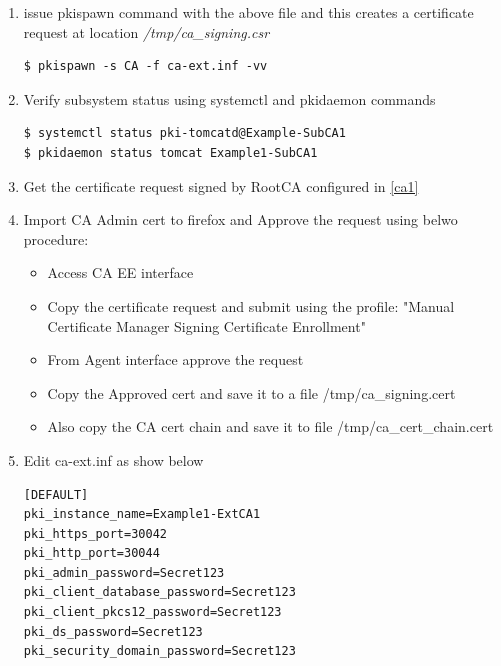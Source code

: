 \documentclass[a4paper]{article}
\begin{document}
\begin{enumerate}[label*=\arabic*.]
\begin{enumerate}[label*=\arabic*.]
\begin{lstlisting}
[DEFAULT]
pki_instance_name=Example1-ExtCA1
pki_https_port=30042
pki_http_port=30044
pki_admin_password=Secret123
pki_client_database_password=Secret123
pki_client_pkcs12_password=Secret123
pki_ds_password=Secret123
pki_security_domain_password=Secret123

[Tomcat]
pki_ajp_port=30009
pki_tomcat_server_port=30005

[CA]
pki_external=True
pki_external_csr_path=/tmp/ca_signing.csr
pki_ca_signing_subject_dn=cn=CA Signing,ou=External,o=example.org
pki_ds_hostname=pki1.example.org
pki_ds_ldap_port=2389
pki_ds_password=Secret123
pki_ds_secure_connection=False
                        \end{lstlisting}
                    \item \label{ca3.2} issue pkispawn command with the above file and this creates a certificate request at location \textit{/tmp/ca\_signing.csr}
                        \begin{lstlisting}[style=bashInputStyle]
$ pkispawn -s CA -f ca-ext.inf -vv
                        \end{lstlisting}
                    \item Verify subsystem status using systemctl and pkidaemon commands
                    \begin{lstlisting}[style=bashInputStyle]
$ systemctl status pki-tomcatd@Example-SubCA1
$ pkidaemon status tomcat Example1-SubCA1
                    \end{lstlisting}
                    \item Get the certificate request signed by RootCA configured in \ref{ca1}
                    \item Import CA Admin cert to firefox and Approve the request using belwo procedure:
                        \begin{itemize}
                            \item Access CA EE interface
                            \item Copy the certificate request and submit using the profile:
                                    "Manual Certificate Manager Signing Certificate Enrollment"
                            \item From Agent interface approve the request
                            \item Copy the Approved cert and save it to a file /tmp/ca\_signing.cert
                            \item Also copy the CA cert chain and save it to file /tmp/ca\_cert\_chain.cert
                        \end{itemize}
                    \item Edit ca-ext.inf as show below
                        \begin{lstlisting}
[DEFAULT]
pki_instance_name=Example1-ExtCA1
pki_https_port=30042
pki_http_port=30044
pki_admin_password=Secret123
pki_client_database_password=Secret123
pki_client_pkcs12_password=Secret123
pki_ds_password=Secret123
pki_security_domain_password=Secret123


\end{lstlisting}
\end{enumerate}
\end{enumerate}
\end{document}
